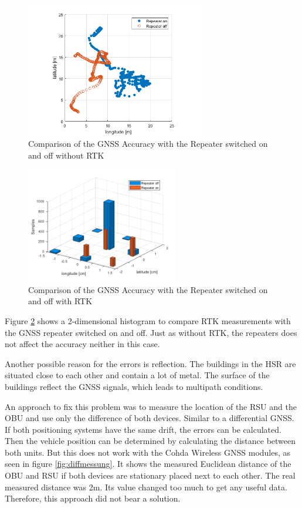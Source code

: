 \begin{figure}[htb]
	\centering
	\includegraphics[width=0.7\textwidth]{images/repeateronoff}
	\caption{Comparison of the GNSS Accuracy with the Repeater switched on and off without RTK}
	\label{fig:repeateronoff}
\end{figure}

\begin{figure}[htb]
	\centering
	\includegraphics[width=0.6\textwidth]{images/2DHistRepOnOff}
	\caption{Comparison of the GNSS Accuracy with the Repeater switched on and off with RTK}
	\label{fig:RepOnOff}
\end{figure}

\newpage

Figure \ref{fig:RepOnOff} shows a 2-dimensional histogram to compare RTK measurements with the GNSS repeater switched on and off. Just as without RTK, the repeaters does not affect the accuracy neither in this case.

Another possible reason for the errors is reflection. The buildings in the HSR are situated close to each other and contain a lot of metal. The surface of the buildings reflect the GNSS signals, which leads to multipath conditions.

\newpage

An approach to fix this problem was to measure the location of the RSU and the OBU and use only the difference of both devices. Similar to a differential GNSS. If both positioning systems have the same drift, the errors can be calculated. Then the vehicle position can be determined by calculating the distance between both units. But this does not work with the Cohda Wireless GNSS modules, as seen in figure \ref{fig:diffmessung}. It shows the measured Euclidean distance of the OBU and RSU if both devices are stationary placed next to each other. The real measured distance was 2\;m. Its value changed too much to get any useful data. Therefore, this approach did not bear a solution.

